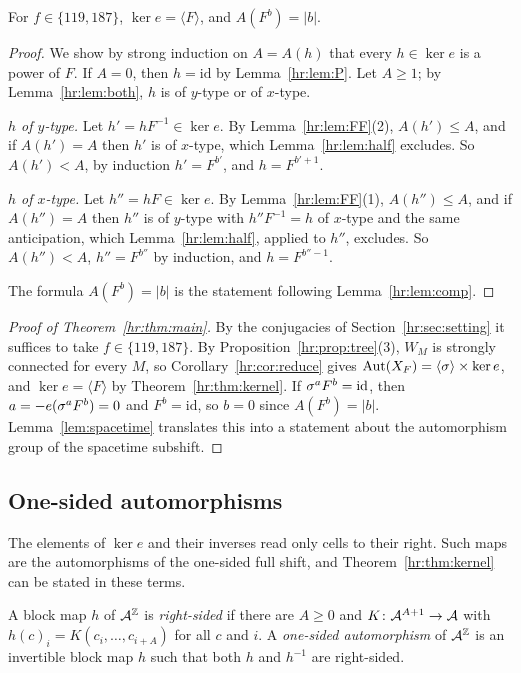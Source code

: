\begin{theorem}\label{hr:thm:kernel}
For $f\in\{119,187\}$, $\ker e=\langle F\rangle$, and $A(F^b)=|b|$.
\end{theorem}

\begin{proof}
We show by strong induction on $A=A(h)$ that every $h\in\ker e$ is a power of $F$. If $A=0$, then $h=\mathrm{id}$ by Lemma~\ref{hr:lem:P}. Let $A\ge1$; by Lemma~\ref{hr:lem:both}, $h$ is of $y$-type or of $x$-type.

\emph{$h$ of $y$-type.} Let $h'=hF^{-1}\in\ker e$. By Lemma~\ref{hr:lem:FF}(2), $A(h')\le A$, and if $A(h')=A$ then $h'$ is of $x$-type, which Lemma~\ref{hr:lem:half} excludes. So $A(h')<A$, by induction $h'=F^{b'}$, and $h=F^{b'+1}$.

\emph{$h$ of $x$-type.} Let $h''=hF\in\ker e$. By Lemma~\ref{hr:lem:FF}(1), $A(h'')\le A$, and if $A(h'')=A$ then $h''$ is of $y$-type with $h''F^{-1}=h$ of $x$-type and the same anticipation, which Lemma~\ref{hr:lem:half}, applied to $h''$, excludes. So $A(h'')<A$, $h''=F^{b''}$ by induction, and $h=F^{b''-1}$.

The formula $A(F^b)=|b|$ is the statement following Lemma~\ref{hr:lem:comp}.
\end{proof}

\begin{proof}[Proof of Theorem~\ref{hr:thm:main}]
By the conjugacies of Section~\ref{hr:sec:setting} it suffices to take $f\in\{119,187\}$. By Proposition~\ref{hr:prop:tree}(3), $W_M$ is strongly connected for every $M$, so Corollary~\ref{hr:cor:reduce} gives $\operatorname{Aut}(X_F)=\langle\sigma\rangle\times\ker e$, and $\ker e=\langle F\rangle$ by Theorem~\ref{hr:thm:kernel}. If $\sigma^aF^b=\mathrm{id}$, then $a=-e(\sigma^aF^b)=0$ and $F^b=\mathrm{id}$, so $b=0$ since $A(F^b)=|b|$. Lemma~\ref{lem:spacetime} translates this into a statement about the automorphism group of the spacetime subshift.
\end{proof}

\subsection{One-sided automorphisms}\label{hr:sec:onesided}

The elements of $\ker e$ and their inverses read only cells to their right. Such maps are the automorphisms of the one-sided full shift, and Theorem~\ref{hr:thm:kernel} can be stated in these terms.

\begin{definition}\label{hr:def:onesided}
A block map $h$ of $\mathcal{A}^{\mathbb{Z}}$ is \emph{right-sided} if there are $A\ge0$ and $K\colon\mathcal{A}^{A+1}\to\mathcal{A}$ with $h(c)_i=K(c_i,\dots,c_{i+A})$ for all $c$ and $i$. A \emph{one-sided automorphism} of $\mathcal{A}^{\mathbb{Z}}$ is an invertible block map $h$ such that both $h$ and $h^{-1}$ are right-sided.
\end{definition}

